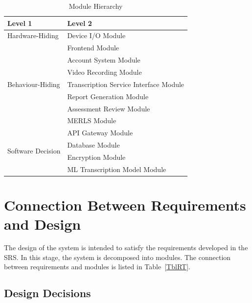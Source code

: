\documentclass[12pt, titlepage]{article}
\begin{document}
\begin{table}[h!]
\centering
\begin{tabular}{p{} p{}}
\toprule
\textbf{Level 1} & \textbf{Level 2}\\
\midrule

{Hardware-Hiding} & Device I/O Module \\
\midrule

\multirow{7}{0.3\textwidth}{Behaviour-Hiding} & Frontend Module\\
& Account System Module\\
& Video Recording Module\\
& Transcription Service Interface Module\\
& Report Generation Module\\
& Assessment Review Module\\
& MERLS Module\\
\midrule

\multirow{4}{0.3\textwidth}{Software Decision} & API Gateway Module\\
& Database Module\\
& Encryption Module\\
& ML Transcription Model Module\\
\bottomrule

\end{tabular}
\caption{Module Hierarchy}
\label{TblMH}
\end{table}

\section{Connection Between Requirements and Design} \label{SecConnection}

The design of the system is intended to satisfy the requirements developed in
the SRS. In this stage, the system is decomposed into modules. The connection
between requirements and modules is listed in Table~\ref{TblRT}.

\subsection*{Design Decisions}
\end{document}
